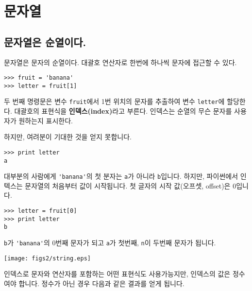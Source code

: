 
\chapter{문자열}
\label{strings}


\section{문자열은 순열이다.}

문자열은 문자의 순열이다. 대괄호 연산자로 한번에 하나씩 문자에 접근할 수 있다.

\beforeverb
\begin{verbatim}
>>> fruit = 'banana'
>>> letter = fruit[1]
\end{verbatim}
\afterverb
%

두 번째 명령문은 변수 {\tt fruit}에서 1번 위치의 문자를 추출하여 변수 {\tt letter}에 할당한다.
대괄호의 표현식을 {\bf 인덱스(index)}라고 부른다. 인덱스는 순열의 무슨 문자를 사용자가 원하는지 표시한다.

하지만, 여려분이 기대한 것을 얻지 못합니다.

\beforeverb
\begin{verbatim}
>>> print letter
a
\end{verbatim}
\afterverb
%

대부분의 사람에게 \verb"'banana'"의 첫 분자는 {\tt a}가 아니라 {\tt b}입니다.
하지만, 파이썬에서 인텍스는 문자열의 처음부터 값이 시작됩니다. 첫 글자의 시작 값(오프셋, offset)은 0입니다.

\beforeverb
\begin{verbatim}
>>> letter = fruit[0]
>>> print letter
b
\end{verbatim}
\afterverb
%

{\tt b}가 \verb"'banana'"의 0번째 문자가 되고 {\tt a}가 첫번째, {\tt n}이 두번째 문자가 됩니다.

\beforefig
\centerline{\texttt{[image: figs2/string.eps]}}
\afterfig


인덱스로 문자와 연산자를 포함하는 어떤 표현식도 사용가능지만, 인덱스의 값은 정수여야 합니다.
정수가 아닌 경우 다음과 같은 결과를 얻게 됩니다.

